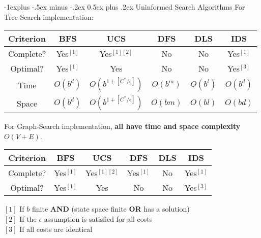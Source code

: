 \documentclass[10pt,landscape,letterpaper]{article}
\makeatletter
\renewcommand{\subsection}{\@startsection{subsection}{2}{0mm}%
                                {-1explus -.5ex minus -.2ex}%
                                {0.5ex plus .2ex}%
                                {\sffamily\normalsize\itshape}}
\makeatother
\begin{document}
\begin{multicols}{3}
\subsection{Uninformed Search Algorithms}
For Tree-Search implementation:
\begin{center}
\begin{tabular}{||c || c | c | c | c | c||} 
 \hline 
 Criterion  & BFS           & UCS           & DFS           & DLS       & IDS           \\
 \hline \hline
 Complete?  & Yes$^{[1]}$   & Yes$^{[1][2]}$& No            & No        & Yes$^{[1]}$   \\
 \hline
 Optimal?   & Yes$^{[1]}$   & Yes           & No            & No        & Yes$^{[3]}$   \\
 \hline
 Time       & $O(b^d)$  & $O(b^{1+[C^*/\epsilon]})$ & $O(b^m)$  & $O(b^l)$  & $O(b^d)$  \\
 \hline
 Space      & $O(b^d)$  & $O(b^{1+[C^*/\epsilon]})$ & $O(bm)$   & $O(bl)$   & $O(bd)$   \\
 \hline
\end{tabular}
\end{center}

For Graph-Search implementation, \textbf{all have time and space complexity $O(V+E)$}.
\begin{center}
\begin{tabular}{||c || c | c | c | c | c||} 
 \hline 
 Criterion  & BFS           & UCS           & DFS           & DLS       & IDS           \\
 \hline \hline
 Complete?  & Yes$^{[1]}$   & Yes$^{[1][2]}$& Yes$^{[1]}$   & No        & Yes$^{[1]}$  \\
 \hline
 Optimal?   & Yes$^{[1]}$   & Yes           & No            & No        & Yes$^{[3]}$   \\
 \hline
\end{tabular}
\end{center}
$[1]$ If $b$ finite \textbf{AND} (state space finite \textbf{OR} has a solution) \\
$[2]$ If the $\epsilon$ assumption is satisfied for all costs \\
$[3]$ If all costs are identical


\end{multicols}
\end{document}
